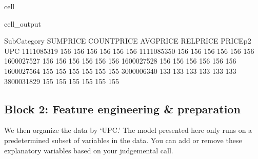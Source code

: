 \documentclass[letterpaper,10pt,english]{jupyterBook}
\begin{document}
\begin{sphinxuseclass}{cell}
\begin{sphinxVerbatimOutput}
\begin{sphinxuseclass}{cell_output}
\begin{sphinxVerbatim}[commandchars=\\\{\}]
            Sub\PYGZhy{}Category  SUMPRICE  COUNTPRICE  AVGPRICE  RELPRICE  PRICE\PYGZus{}p2  
UPC                                                                           
1111085319           156       156         156       156       156       156  
1111085350           156       156         156       156       156       156  
1600027527           156       156         156       156       156       156  
1600027528           156       156         156       156       156       156  
1600027564           155       155         155       155       155       155  
3000006340           133       133         133       133       133       133  
3800031829           155       155         155       155       155       155  
\end{sphinxVerbatim}

\end{sphinxuseclass}\end{sphinxVerbatimOutput}

\end{sphinxuseclass}

\subsection{Block 2: Feature engineering \& preparation}
\label{\detokenize{docs/Case1_2_Module1A_Retail_Demand_Model:block-2-feature-engineering-preparation}}
\sphinxAtStartPar
We then organize the data by ‘UPC.’ The model presented here only runs on a predetermined subset of variables in the data. You can add or remove these explanatory variables based on your judgemental call.
\end{document}
